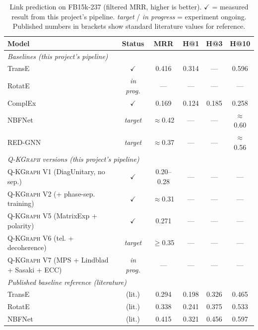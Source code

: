\documentclass[runningheads]{llncs}
\newcommand{\QR}{\textsc{Q-KGraph}}
\newcommand{\inprog}[1]{\textcolor{inprogress}{\textit{#1}}}
\begin{document}
\begin{table}[t]
\caption{Link prediction on FB15k-237 (filtered MRR, higher is better).
  $\checkmark$ = measured result from this project's pipeline.
  \inprog{target} / \inprog{in progress} = experiment ongoing.
  Published numbers in brackets show standard literature values for reference.}
\label{tab:main}
\centering
\small
\begin{tabular}{lccccc}
\toprule
Model                             & Status  & MRR   & H@1   & H@3   & H@10  \\
\midrule
\multicolumn{6}{l}{\textit{Baselines (this project's pipeline)}} \\
TransE                            & $\checkmark$ & 0.416 & 0.314 & ---   & 0.596 \\
RotatE                            & \inprog{in prog.} & ---   & ---   & ---   & ---   \\
ComplEx                           & $\checkmark$ & 0.169 & 0.124 & 0.185 & 0.258 \\
NBFNet~\cite{ref_nbfnet}          & \inprog{target} & $\approx$0.42 & --- & --- & $\approx$0.60 \\
RED-GNN~\cite{ref_redgnn}         & \inprog{target} & $\approx$0.37 & --- & --- & $\approx$0.56 \\
\midrule
\multicolumn{6}{l}{\textit{\QR{} versions (this project's pipeline)}} \\
\QR{} V1 (DiagUnitary, no sep.)   & $\checkmark$ & 0.20--0.28 & --- & --- & --- \\
\QR{} V2 (+ phase-sep. training)  & $\checkmark$ & $\approx$0.31 & --- & --- & --- \\
\QR{} V5 (MatrixExp + polarity)   & $\checkmark$ & 0.271 & --- & --- & --- \\
\QR{} V6 (tel. + decoherence)     & \inprog{target} & $\geq$0.35 & --- & --- & --- \\
\QR{} V7 (MPS + Lindblad + Sasaki + ECC) & \inprog{in prog.} & --- & --- & --- & --- \\
\midrule
\multicolumn{6}{l}{\textit{Published baseline reference (literature)}} \\
TransE~\cite{ref_transe}           & (lit.)    & 0.294 & 0.198 & 0.326 & 0.465 \\
RotatE~\cite{ref_rotate}           & (lit.)    & 0.338 & 0.241 & 0.375 & 0.533 \\
NBFNet~\cite{ref_nbfnet}           & (lit.)    & 0.415 & 0.321 & 0.456 & 0.597 \\
\bottomrule
\end{tabular}
\end{table}
\end{document}
